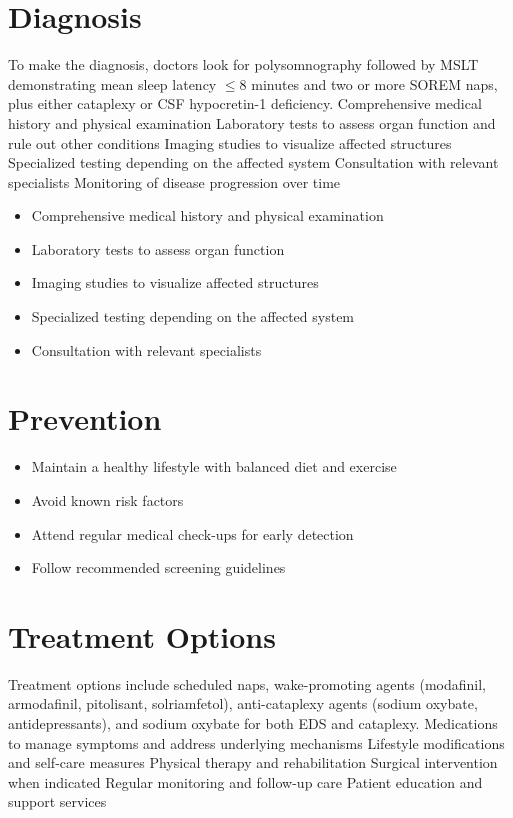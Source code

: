 \section{Diagnosis}
To make the diagnosis, doctors look for polysomnography followed by MSLT demonstrating mean sleep latency $\le$8 minutes and two or more SOREM naps, plus either cataplexy or CSF hypocretin-1 deficiency. Comprehensive medical history and physical examination Laboratory tests to assess organ function and rule out other conditions Imaging studies to visualize affected structures Specialized testing depending on the affected system Consultation with relevant specialists Monitoring of disease progression over time

\begin{itemize}[noitemsep]
  \item Comprehensive medical history and physical examination
  \item Laboratory tests to assess organ function
  \item Imaging studies to visualize affected structures
  \item Specialized testing depending on the affected system
  \item Consultation with relevant specialists
\end{itemize}
\section{Prevention}
\begin{itemize}[noitemsep]
  \item Maintain a healthy lifestyle with balanced diet and exercise
  \item Avoid known risk factors
  \item Attend regular medical check-ups for early detection
  \item Follow recommended screening guidelines
\end{itemize}
\section{Treatment Options}
Treatment options include scheduled naps, wake-promoting agents (modafinil, armodafinil, pitolisant, solriamfetol), anti-cataplexy agents (sodium oxybate, antidepressants), and sodium oxybate for both EDS and cataplexy. Medications to manage symptoms and address underlying mechanisms Lifestyle modifications and self-care measures Physical therapy and rehabilitation Surgical intervention when indicated Regular monitoring and follow-up care Patient education and support services


